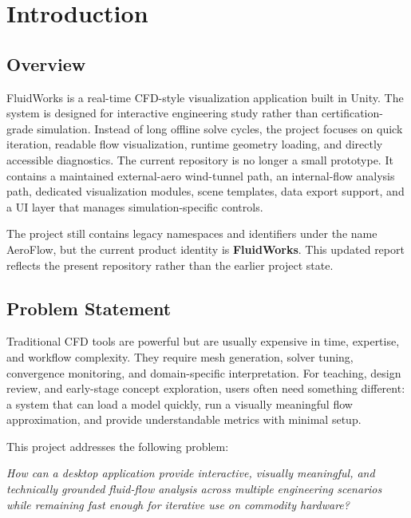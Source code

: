 \documentclass[12pt,a4paper,titlepage]{report}
\newcommand{\LegacyProductName}{AeroFlow}
\begin{document}
\chapter{Introduction}
\section{Overview}
FluidWorks is a real-time CFD-style visualization application built in Unity. The system is designed for interactive engineering study rather than certification-grade simulation. Instead of long offline solve cycles, the project focuses on quick iteration, readable flow visualization, runtime geometry loading, and directly accessible diagnostics. The current repository is no longer a small prototype. It contains a maintained external-aero wind-tunnel path, an internal-flow analysis path, dedicated visualization modules, scene templates, data export support, and a UI layer that manages simulation-specific controls.

The project still contains legacy namespaces and identifiers under the name \LegacyProductName{}, but the current product identity is \textbf{FluidWorks}. This updated report reflects the present repository rather than the earlier project state.

\section{Problem Statement}
Traditional CFD tools are powerful but are usually expensive in time, expertise, and workflow complexity. They require mesh generation, solver tuning, convergence monitoring, and domain-specific interpretation. For teaching, design review, and early-stage concept exploration, users often need something different: a system that can load a model quickly, run a visually meaningful flow approximation, and provide understandable metrics with minimal setup.

This project addresses the following problem:

\textit{How can a desktop application provide interactive, visually meaningful, and technically grounded fluid-flow analysis across multiple engineering scenarios while remaining fast enough for iterative use on commodity hardware?}
\end{document}
